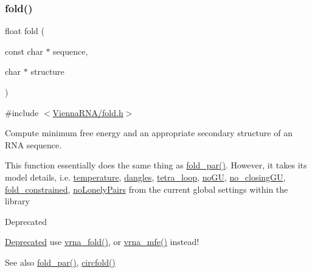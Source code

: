 \subsubsection{\texorpdfstring{fold()}{fold()}}
{\footnotesize\ttfamily float fold (\begin{DoxyParamCaption}\item[{const char $\ast$}]{sequence,  }\item[{char $\ast$}]{structure }\end{DoxyParamCaption})}



{\ttfamily \#include $<$\hyperlink{fold_8h}{Vienna\+R\+N\+A/fold.\+h}$>$}



Compute minimum free energy and an appropriate secondary structure of an R\+NA sequence. 

This function essentially does the same thing as \hyperlink{group__mfe__global__deprecated_ga2bc41df5d71fee6fd8da9904ee65d8fb}{fold\+\_\+par()}. However, it takes its model details, i.\+e. \hyperlink{group__model__details_gab4b11c8d9c758430960896bc3fe82ead}{temperature}, \hyperlink{group__model__details_ga72b511ed1201f7e23ec437e468790d74}{dangles}, \hyperlink{group__model__details_ga4f6265bdf0ead7ff4628a360adbfd77e}{tetra\+\_\+loop}, \hyperlink{group__model__details_gabf380d09e4f1ab94fc6af57cf0ad5d32}{no\+GU}, \hyperlink{group__model__details_gaa8d1c7b92489179e1eafa562b7bdd259}{no\+\_\+closing\+GU}, \hyperlink{fold__vars_8h_a0afc287c2464866d94858c39175154af}{fold\+\_\+constrained}, \hyperlink{group__model__details_ga097eccaabd6ae8b4fef83cccff85bb5d}{no\+Lonely\+Pairs} from the current global settings within the library

\begin{DoxyRefDesc}{Deprecated}
\item[\hyperlink{deprecated__deprecated000067}{Deprecated}]use \hyperlink{group__mfe__global_ga29a33b2895f4e67b0480271ff289afdc}{vrna\+\_\+fold()}, or \hyperlink{group__mfe__global_gabd3b147371ccf25c577f88bbbaf159fd}{vrna\+\_\+mfe()} instead!\end{DoxyRefDesc}


\begin{DoxySeeAlso}{See also}
\hyperlink{group__mfe__global__deprecated_ga2bc41df5d71fee6fd8da9904ee65d8fb}{fold\+\_\+par()}, \hyperlink{group__mfe__global__deprecated_ga4ac63ab3e8d9a80ced28b8052d94e423}{circfold()}
\end{DoxySeeAlso}

